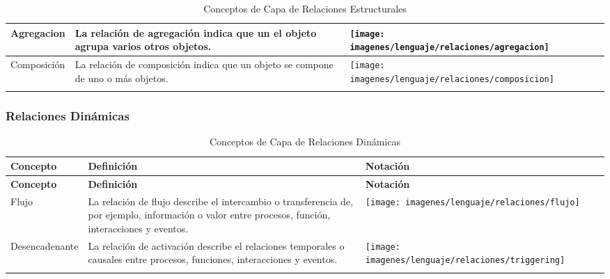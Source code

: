 \begin{center}
\begin{longtable}[h]{| >{\centering\arraybackslash}m{3cm} | >{\arraybackslash}m{6cm} | p{4cm} | p{5cm} | p{4cm} |}
		Agregacion
		&\vspace{1mm}  La relación de agregación indica que un
		el objeto agrupa varios otros objetos.
		& \texttt{[image: imagenes/lenguaje/relaciones/agregacion]}  \\ \hline 
		
		Composición 
		&\vspace{1mm} La relación de composición indica que
		un objeto se compone de uno o más
		objetos.
		& \texttt{[image: imagenes/lenguaje/relaciones/composicion]}  \\ \hline 			
		
		\caption{Conceptos de Capa de Relaciones Estructurales}
		
	\end{longtable}
\end{center}

\subsubsection{Relaciones Dinámicas}
\begin{center}
	\begin{longtable}[h]{| >{\centering\arraybackslash}m{3cm} | >{\arraybackslash}m{6cm} | p{4cm} | p{5cm} | p{4cm} |}
		
		\hline
		\textbf{Concepto} &  \centering \textbf{Definición} & \textbf{Notación} \\
		\hline
		\endfirsthead
		
		
		\hline
		\textbf{Concepto} &  \centering \textbf{Definición} & \textbf{Notación} \\
		\hline
		\endhead
		
		Flujo      
		& \vspace{1mm} La relación de flujo describe el intercambio
		o transferencia de, por ejemplo, información o
		valor entre procesos, función,
		interacciones y eventos.       
		&\texttt{[image: imagenes/lenguaje/relaciones/flujo]}  \\ \hline
		
		Desencadenante
		& \vspace{1mm} La relación de activación describe el
		relaciones temporales o causales entre
		procesos, funciones, interacciones y eventos.  
		& \texttt{[image: imagenes/lenguaje/relaciones/triggering]}  \\ \hline
		
		\caption{Conceptos de Capa de Relaciones Dinámicas}
		
	\end{longtable}
\end{center}

